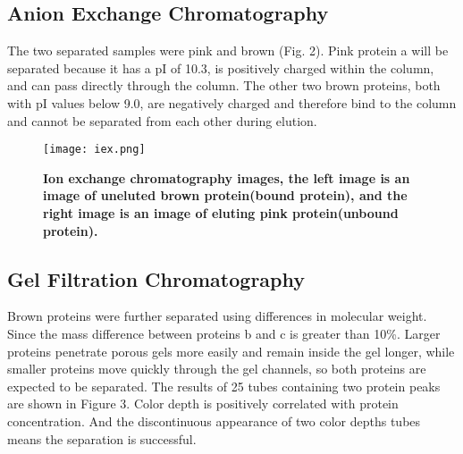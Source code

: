 \documentclass[a4paper,10pt]{article}
\begin{document}
\begin{multicols}{2}
\subsection{Anion Exchange Chromatography}
The two separated samples were pink and brown (Fig. 2). Pink protein a will be separated because it has a pI of 10.3, is positively charged within the column, and can pass directly through the column. The other two brown proteins, both with pI values below 9.0, are negatively charged and therefore bind to the column and cannot be separated from each other during elution.


\begin{figure}[H]
\centering
\texttt{[image: iex.png]}
\caption{\scriptsize \textbf{Ion exchange chromatography images, the left image is an image of uneluted brown protein(bound protein), and the right image is an image of eluting pink protein(unbound protein).}}
\label{fig2}
\end{figure}


\subsection{Gel Filtration Chromatography}
Brown proteins were further separated using differences in molecular weight. Since the mass difference between proteins b and c is greater than 10\%. Larger proteins penetrate porous gels more easily and remain inside the gel longer, while smaller proteins move quickly through the gel channels, so both proteins are expected to be separated. The results of 25 tubes containing two protein peaks are shown in Figure 3. Color depth is positively correlated with protein concentration. And the discontinuous appearance of two color depths tubes means the separation is successful.


\iffalse
\begin{figure*}
\centering
\texttt{[image: gel.jpg]}
\captionsetup{font={scriptsize,bf,stretch=1}}
\caption{\scriptsize \textbf{PCR verification for putative transformants 1 and 2. Lanes 1 and 2 were set as negative controls which added the genome of the negative strain as a template. Lanes 3 and 4 added the genome of transformant 1 as a template. Lanes 5 and 6 added the genome of transformant 2 as a template. Samples of lanes 1, 3 and 5 were amplified DNA with diagnostic primers ANID\_08549F and ANID\_08549R. Samples of lanes 2, 4 and 6 were amplified DNA with diagnostic primers ANID\_08549F and Af-Revers.}}
\label{fig3}
\end{figure*}
\fi



\end{multicols}
\end{document}
